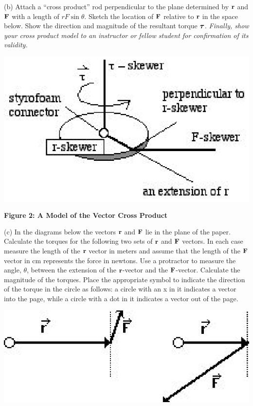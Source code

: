 (b) Attach a ``cross product'' rod perpendicular to the plane
determined by \( {\bf r} \) and \( {\bf F} \) with a
length of $rF\sin \theta$. Sketch the location of \( {\bf F} \)
relative to \( {\bf r} \) in the space below. Show the direction
and magnitude of the resultant torque \( {\mbox{\boldmath$\tau$} } \). \textit{Finally,
show your cross product model to an instructor or fellow student for confirmation
of its validity. }

\vspace{0.3cm}
{\par\centering \includegraphics{ang_mom/ang_mom_fig4.eps} \par}
\vspace{0.3cm}

\textbf{Figure 2: A Model of the Vector Cross Product}

(c) In the diagrams below the vectors \( {\bf r} \) and \( {\bf F} \)
lie in the plane of the paper. Calculate the torques for the following two sets
of \( {\bf r} \) and \( {\bf F} \) vectors. In each
case measure the length of the \( {\bf r} \) vector in meters and
assume that the length of the \( {\bf F} \) vector in cm represents
the force in newtons. Use a protractor to measure the angle, \( \theta  \),
between the extension of the \( {\bf r} \)-vector and the \( {\bf F} \)-vector.
Calculate the magnitude of the torques. Place the appropriate symbol to indicate
the direction of the torque in the circle as follows: a circle with an x in
it indicates a vector into the page, while a circle with a dot in it indicates
a vector out of the page.

\vspace{0.3cm}
{\par\centering \includegraphics{ang_mom/ang_mom_fig5.eps} \par}
\vspace{0.3cm}

